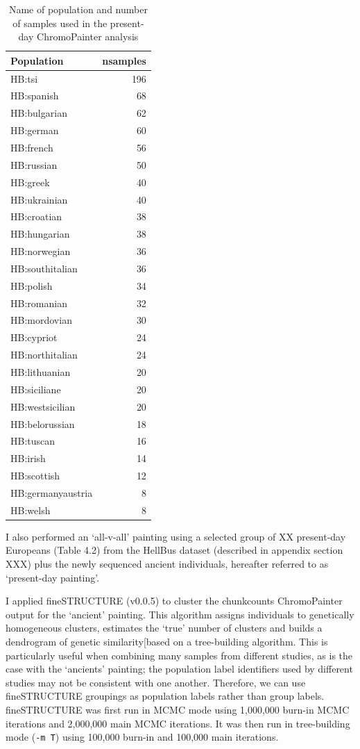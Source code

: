 \begin{table}
\small
\begin{tabular}{l|r}
\hline
Population & nsamples\\
\hline
HB:tsi & 196\\
\hline
HB:spanish & 68\\
\hline
HB:bulgarian & 62\\
\hline
HB:german & 60\\
\hline
HB:french & 56\\
\hline
HB:russian & 50\\
\hline
HB:greek & 40\\
\hline
HB:ukrainian & 40\\
\hline
HB:croatian & 38\\
\hline
HB:hungarian & 38\\
\hline
HB:norwegian & 36\\
\hline
HB:southitalian & 36\\
\hline
HB:polish & 34\\
\hline
HB:romanian & 32\\
\hline
HB:mordovian & 30\\
\hline
HB:cypriot & 24\\
\hline
HB:northitalian & 24\\
\hline
HB:lithuanian & 20\\
\hline
HB:siciliane & 20\\
\hline
HB:westsicilian & 20\\
\hline
HB:belorussian & 18\\
\hline
HB:tuscan & 16\\
\hline
HB:irish & 14\\
\hline
HB:scottish & 12\\
\hline
HB:germanyaustria & 8\\
\hline
HB:welsh & 8\\
\hline
\end{tabular}
\caption{Name of population and number of samples used in the present-day ChromoPainter analysis}
\end{table}

I also performed an `all-v-all' painting using a selected group of XX present-day Europeans (Table 4.2) from the HellBus dataset (described in appendix section XXX) plus the newly sequenced ancient individuals, hereafter referred to as `present-day painting'.

I applied fineSTRUCTURE (v0.0.5)\cite{Lawson2012} to cluster the chunkcounts ChromoPainter output for the `ancient' painting. This algorithm assigns individuals to genetically homogeneous clusters, estimates the `true' number of clusters and builds a dendrogram of genetic similarity[based on a tree-building algorithm. This is particularly useful when combining many samples from different studies, as is the case with the `ancients' painting; the population label identifiers used by different studies may not be consistent with one another. Therefore, we can use fineSTRUCTURE groupings as population labels rather than group labels. fineSTRUCTURE was first run in MCMC mode using 1,000,000 burn-in MCMC iterations and 2,000,000 main MCMC iterations. It was then run in tree-building mode (\texttt{-m T}) using 100,000 burn-in and 100,000 main iterations. 

